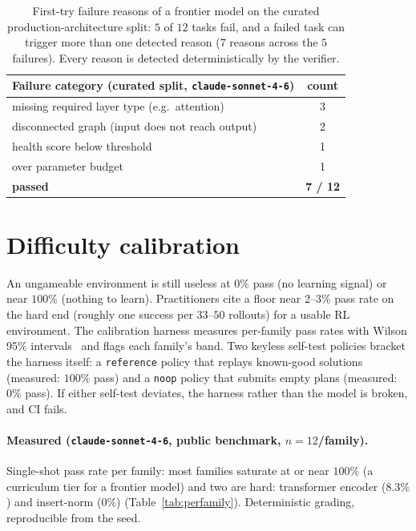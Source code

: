 \documentclass{article}
\begin{document}
\begin{table}[t]
\centering
\small
\begin{tabular}{lc}
\toprule
Failure category (curated split, \texttt{claude-sonnet-4-6}) & count \\
\midrule
missing required layer type (e.g.\ attention) & 3 \\
disconnected graph (input does not reach output) & 2 \\
health score below threshold & 1 \\
over parameter budget & 1 \\
\midrule
\textbf{passed} & \textbf{7 / 12} \\
\bottomrule
\end{tabular}
\caption{First-try failure reasons of a frontier model on the curated production-architecture split: $5$ of $12$ tasks fail, and a failed task can trigger more than one detected reason ($7$ reasons across the $5$ failures). Every reason is detected deterministically by the verifier.}
\label{tab:curated}
\end{table}

\section{Difficulty calibration}
\label{sec:calib}
An ungameable environment is still useless at $0\%$ pass (no learning signal) or near $100\%$ (nothing to learn). Practitioners cite a floor near 2--3\% pass rate on the hard end (roughly one success per $33$--$50$ rollouts) for a usable RL environment. The calibration harness measures per-family pass rates with Wilson 95\% intervals~\cite{wilson} and flags each family's band. Two keyless self-test policies bracket the harness itself: a \texttt{reference} policy that replays known-good solutions (measured: $100\%$ pass) and a \texttt{noop} policy that submits empty plans (measured: $0\%$ pass). If either self-test deviates, the harness rather than the model is broken, and CI fails.

\paragraph{Measured (\texttt{claude-sonnet-4-6}, public benchmark, $n=12$/family).} Single-shot pass rate per family: most families saturate at or near $100\%$ (a curriculum tier for a frontier model) and two are hard: transformer encoder ($8.3\%$) and insert-norm ($0\%$) (Table~\ref{tab:perfamily}). Deterministic grading, reproducible from the seed.
\end{document}
